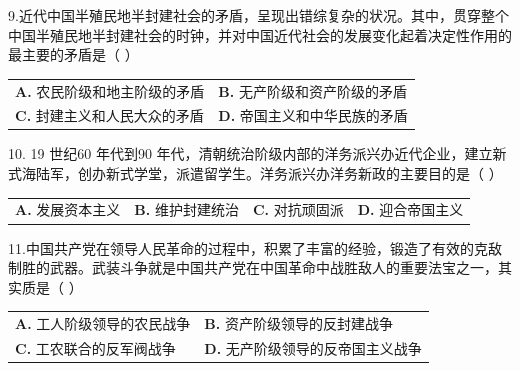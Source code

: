 \documentclass[UTF8,11pt]{ctexart}
\begin{document}
9.近代中国半殖民地半封建社会的矛盾，呈现出错综复杂的状况。其中，贯穿整个中国半殖民地半封建社会的时钟，并对中国近代社会的发展变化起着决定性作用的最主要的矛盾是（  ）


\begin{center}\begin{tabular}{>{\raggedright\arraybackslash}p{\dimexpr(\linewidth-4\tabcolsep)/2\relax}>{\raggedright\arraybackslash}p{\dimexpr(\linewidth-4\tabcolsep)/2\relax}}
\textbf{A.} 农民阶级和地主阶级的矛盾 & \textbf{B.} 无产阶级和资产阶级的矛盾\\[.35em]
\textbf{C.} 封建主义和人民大众的矛盾 & \textbf{D.} 帝国主义和中华民族的矛盾\\[.35em]\end{tabular}\end{center}

10. 19 世纪60 年代到90 年代，清朝统治阶级内部的洋务派兴办近代企业，建立新式海陆军，创办新式学堂，派遣留学生。洋务派兴办洋务新政的主要目的是（  ）


\begin{center}\begin{tabular}{>{\raggedright\arraybackslash}p{\dimexpr(\linewidth-8\tabcolsep)/4\relax}>{\raggedright\arraybackslash}p{\dimexpr(\linewidth-8\tabcolsep)/4\relax}>{\raggedright\arraybackslash}p{\dimexpr(\linewidth-8\tabcolsep)/4\relax}>{\raggedright\arraybackslash}p{\dimexpr(\linewidth-8\tabcolsep)/4\relax}}
\textbf{A.} 发展资本主义 & \textbf{B.} 维护封建统治 & \textbf{C.} 对抗顽固派 & \textbf{D.} 迎合帝国主义\\[.35em]\end{tabular}\end{center}

11.中国共产党在领导人民革命的过程中，积累了丰富的经验，锻造了有效的克敌制胜的武器。武装斗争就是中国共产党在中国革命中战胜敌人的重要法宝之一，其实质是（  ）


\begin{center}\begin{tabular}{>{\raggedright\arraybackslash}p{\dimexpr(\linewidth-4\tabcolsep)/2\relax}>{\raggedright\arraybackslash}p{\dimexpr(\linewidth-4\tabcolsep)/2\relax}}
\textbf{A.} 工人阶级领导的农民战争 & \textbf{B.} 资产阶级领导的反封建战争\\[.35em]
\textbf{C.} 工农联合的反军阀战争 & \textbf{D.} 无产阶级领导的反帝国主义战争\\[.35em]\end{tabular}\end{center}
\end{document}
